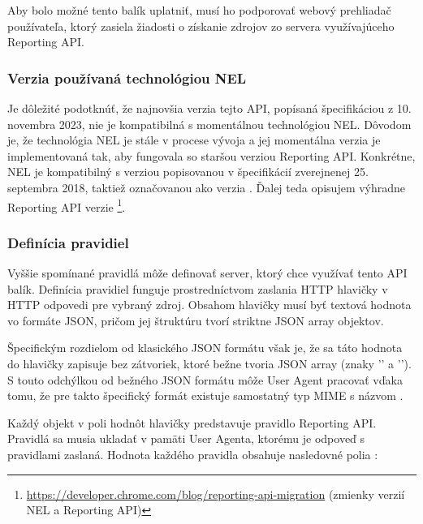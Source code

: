 Aby bolo možné tento balík uplatniť, musí ho podporovať webový prehliadač používateľa, ktorý zasiela žiadosti o získanie zdrojov zo servera využívajúceho Reporting API.

\subsubsection{Verzia používaná technológiou NEL}

Je dôležité podotknúť, že najnovšia verzia tejto API, popísaná špecifikáciou z 10. novembra 2023, nie je kompatibilná s momentálnou technológiou NEL.
Dôvodom je, že technológia NEL je stále v procese vývoja a jej momentálna verzia je implementovaná tak, aby fungovala so staršou verziou Reporting API.
Konkrétne, NEL je kompatibilný s verziou popisovanou v špecifikácií zverejnenej 
25. septembra 2018, taktiež označovanou ako verzia \emph{}.
Ďalej teda opisujem výhradne Reporting API verzie \footnote{\url{https://developer.chrome.com/blog/reporting-api-migration} (zmienky verzií NEL a Reporting API)}.

\subsubsection{Definícia pravidiel}

Vyššie spomínané pravidlá môže definovať server, ktorý chce využívať tento API balík. 
Definícia pravidiel funguje prostredníctvom zaslania HTTP hlavičky  v HTTP odpovedi pre vybraný zdroj.
Obsahom hlavičky  musí byť textová hodnota vo formáte JSON, pričom jej štruktúru tvorí striktne JSON array objektov.

Špecifickým rozdielom od klasického JSON formátu však je, že sa táto hodnota do hlavičky
zapisuje bez zátvoriek, ktoré bežne tvoria JSON array (znaky '\code{[}' a '\code{]}').
S touto odchýlkou od bežného JSON formátu môže User Agent pracovať vďaka tomu, že pre takto špecifický formát existuje samostatný typ MIME s názvom . 

Každý objekt v poli hodnôt hlavičky  predstavuje pravidlo Reporting API.
Pravidlá sa musia ukladať v pamäti User Agenta, ktorému je odpoveď s pravidlami zaslaná.
Hodnota každého pravidla obsahuje nasledovné polia \cite{W3C-reporting-api}: 

